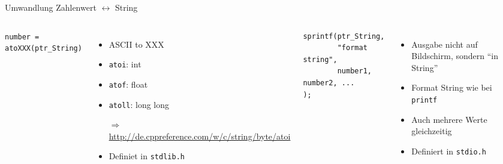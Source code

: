 \begin{frame}[fragile]{Umwandlung Zahlenwert $\leftrightarrow$ String}
%
\begin{columns}[T]
\begin{codebox}
\footnotesize\texttt{number = atoXXX(ptr\_String)}
\end{codebox}
\begin{itemize}
\item ASCII to XXX
\item \texttt{atoi}: int
\item \texttt{atof}: float
\item \texttt{atoll}: long long
\item[$\Rightarrow$] \url{http://de.cppreference.com/w/c/string/byte/atoi}
\item Definiet in \texttt{stdlib.h}
\end{itemize}
%
\begin{codebox}
\begin{verbatim}
sprintf(ptr_String, 
        "format string", 
        number1, number2, ...
);
\end{verbatim}
\end{codebox}
\begin{itemize}
\item Ausgabe nicht auf Bildschirm, sondern \enquote{in String}
\item Format String wie bei \texttt{printf}
\item Auch mehrere Werte gleichzeitig
\item Definiert in \texttt{stdio.h}
\end{itemize}
\end{columns}
%
\end{frame}


